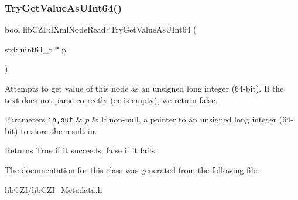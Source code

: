\subsubsection{\texorpdfstring{Try\+Get\+Value\+As\+U\+Int64()}{TryGetValueAsUInt64()}}
{\footnotesize\ttfamily bool lib\+C\+Z\+I\+::\+I\+Xml\+Node\+Read\+::\+Try\+Get\+Value\+As\+U\+Int64 (\begin{DoxyParamCaption}\item[{std\+::uint64\+\_\+t $\ast$}]{p }\end{DoxyParamCaption})}

Attempts to get value of this node as an unsigned long integer (64-\/bit). If the text does not parse correctly (or is empty), we return false. 
\begin{DoxyParams}[1]{Parameters}
\mbox{\tt in,out}  & {\em p} & If non-\/null, a pointer to an unsigned long integer (64-\/bit) to store the result in. \\
\hline
\end{DoxyParams}
\begin{DoxyReturn}{Returns}
True if it succeeds, false if it fails. 
\end{DoxyReturn}


The documentation for this class was generated from the following file\+:\begin{DoxyCompactItemize}
\item 
lib\+C\+Z\+I/lib\+C\+Z\+I\+\_\+\+Metadata.\+h\end{DoxyCompactItemize}
